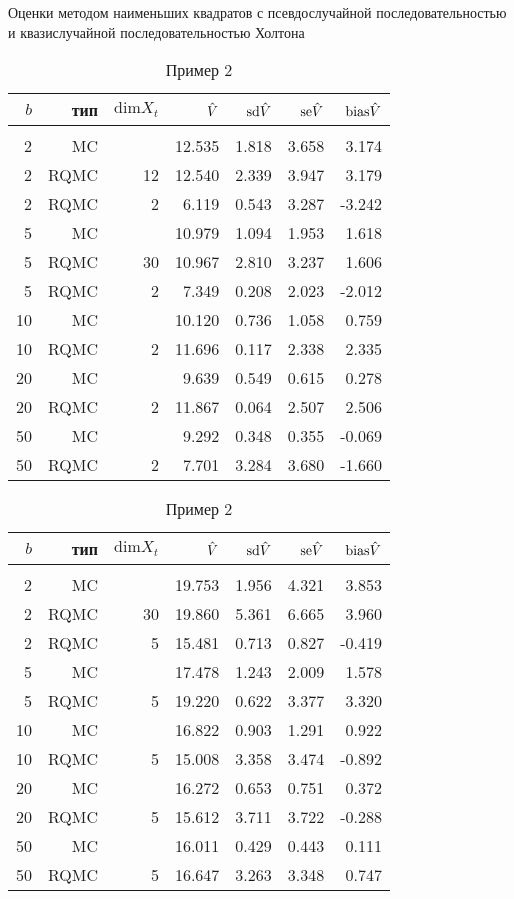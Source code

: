 \begin{table}
    \renewcommand{\arraystretch}{0.6}
    \centering
    Оценки методом наименьших квадратов с псевдослучайной последовательностью и квазислучайной последовательностью Холтона
    \caption{Пример 1}\label{tbl:lsm_halton_ex1}
    \begin{tabular}{rrrrrrr}
        $b$&тип&$\mathrm{dim} X_t$&$\hat{V}$&$\mathrm{sd}\hat{V}$&$\mathrm{se}\hat{V}$&$\mathrm{bias}\hat{V}$\\[3pt]\hline\\[-8pt]
        2&MC&&12.535&1.818&3.658&3.174\\
        2&RQMC&12&12.540&2.339&3.947&3.179\\
        2&RQMC&2&6.119&0.543&3.287&-3.242\\[3pt]
        5&MC&&10.979&1.094&1.953&1.618\\
        5&RQMC&30&10.967&2.810&3.237&1.606\\
        5&RQMC&2&7.349&0.208&2.023&-2.012\\[3pt]
        10&MC&&10.120&0.736&1.058&0.759\\
        10&RQMC&2&11.696&0.117&2.338&2.335\\[3pt]
        20&MC&&9.639&0.549&0.615&0.278\\
        20&RQMC&2&11.867&0.064&2.507&2.506\\[3pt]
        50&MC&&9.292&0.348&0.355&-0.069\\
        50&RQMC&2&7.701&3.284&3.680&-1.660\\[3pt]
    \end{tabular}

    \centering
    \caption{Пример 2}\label{tbl:lsm_halton_ex2}
    \begin{tabular}{rrrrrrr}
        $b$&тип&$\mathrm{dim} X_t$&$\hat{V}$&$\mathrm{sd}\hat{V}$&$\mathrm{se}\hat{V}$&$\mathrm{bias}\hat{V}$\\[3pt]\hline\\[-8pt]
        2&MC&&19.753&1.956&4.321&3.853\\
        2&RQMC&30&19.860&5.361&6.665&3.960\\
        2&RQMC&5&15.481&0.713&0.827&-0.419\\[3pt]
        5&MC&&17.478&1.243&2.009&1.578\\
        5&RQMC&5&19.220&0.622&3.377&3.320\\[3pt]
        10&MC&&16.822&0.903&1.291&0.922\\
        10&RQMC&5&15.008&3.358&3.474&-0.892\\[3pt]
        20&MC&&16.272&0.653&0.751&0.372\\
        20&RQMC&5&15.612&3.711&3.722&-0.288\\[3pt]
        50&MC&&16.011&0.429&0.443&0.111\\
        50&RQMC&5&16.647&3.263&3.348&0.747\\[3pt]
    \end{tabular}


\end{table}
